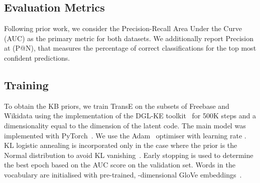 \documentclass[11pt]{article}
\begin{document}
\begin{table}[t!]
    \centering
    \caption{Datasets statistics. `NA' correponds to the `no relation' category.}
    \label{tab:data_stats}
\end{table}




\subsection{Evaluation Metrics}
Following prior work, we consider the Precision-Recall Area Under the Curve (AUC) as the primary metric for both datasets. 
We additionally report Precision at  (P@N), that measures the percentage of correct classifications for the top  most confident predictions.




\subsection{Training}
To obtain the KB priors, we train TransE on the subsets of Freebase and Wikidata using the implementation of the DGL-KE toolkit~\citep{DGL-KE} for 500K steps and a dimensionality equal to the dimension of the latent code.
The main model was implemented with PyTorch~\citep{pytorch}.
We use the Adam~\citep{kingma2014adam} optimiser with learning rate . KL logistic annealing is incorporated only in the case where the prior is the Normal distribution to avoid KL vanishing~\citep{bowman2016generating}. Early stopping is used to determine the best epoch based on the AUC score on the validation set.
Words in the vocabulary are initialised with pre-trained, -dimensional GloVe embeddings~\citep{pennington2014glove}.
\end{document}
